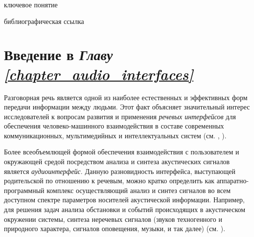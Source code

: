 \begin{SCn}
\bigskip

\begin{scnrelfromlist}{ключевое понятие}
\end{scnrelfromlist}

\bigskip

\begin{scnrelfromlist}{библиографическая ссылка}
\end{scnrelfromlist}

\end{SCn}


\section{Введение в \textit{Главу \ref{chapter_audio_interfaces}~}}
\label{sec_audio_interfaces_review}

Разговорная речь является одной из наиболее естественных и эффективных форм передачи информации между людьми. Этот факт объясняет значительный интерес исследователей к вопросам развития и применения \textit{речевых интерфейсов} для обеспечения человеко-машинного взаимодействия в составе современных коммуникационных, мультимедийных и интеллектуальных систем (см. , ).

Более всеобъемлющей формой обеспечения взаимодействия с пользователем и окружающей средой посредством анализа и синтеза акустических сигналов является \textit{аудиоинтерфейс}. Данную разновидность интерфейса, выступающей родительской по отношению к речевым, можно кратко определить как аппаратно-программный комплекс осуществляющий анализ и синтез сигналов во всем доступном спектре параметров носителей акустической информации. Например, для решения задач анализа обстановки и событий происходящих в акустическом окружении системы, синтеза неречевых сигналов (звуков техногенного и природного характера, сигналов оповещения, музыки, и так далее) (см. ).

